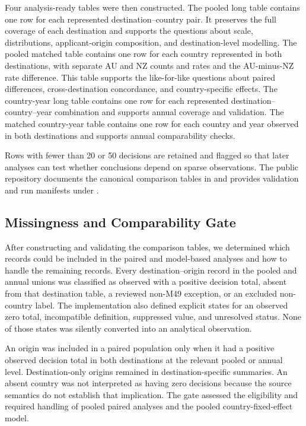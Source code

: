 \documentclass[runningheads]{llncs}
\begin{document}
Four analysis-ready tables were then constructed. The pooled long table contains one row for each represented destination--country pair. It preserves the full coverage of each destination and supports the questions about scale, distributions, applicant-origin composition, and destination-level modelling. The pooled matched table contains one row for each country represented in both destinations, with separate AU and NZ counts and rates and the AU-minus-NZ rate difference. This table supports the like-for-like questions about paired differences, cross-destination concordance, and country-specific effects. The country-year long table contains one row for each represented destination--country--year combination and supports annual coverage and validation. The matched country-year table contains one row for each country and year observed in both destinations and supports annual comparability checks.

Rows with fewer than 20 or 50 decisions are retained and flagged so that later analyses can test whether conclusions depend on sparse observations. The public repository documents the canonical comparison tables in  and provides validation and run manifests under  \cite{Kaplan2026AUNZComparisonRepository}.

\subsection{Missingness and Comparability Gate}

After constructing and validating the comparison tables, we determined which records could be included in the paired and model-based analyses and how to handle the remaining records. Every destination--origin record in the pooled and annual unions was classified as observed with a positive decision total, absent from that destination table, a reviewed non-M49 exception, or an excluded non-country label. The implementation also defined explicit states for an observed zero total, incompatible definition, suppressed value, and unresolved status. None of those states was silently converted into an analytical observation.

An origin was included in a paired population only when it had a positive observed decision total in both destinations at the relevant pooled or annual level. Destination-only origins remained in destination-specific summaries. An absent country was not interpreted as having zero decisions because the source semantics do not establish that implication. The gate assessed the eligibility and required handling of pooled paired analyses and the pooled country-fixed-effect model.
\end{document}
